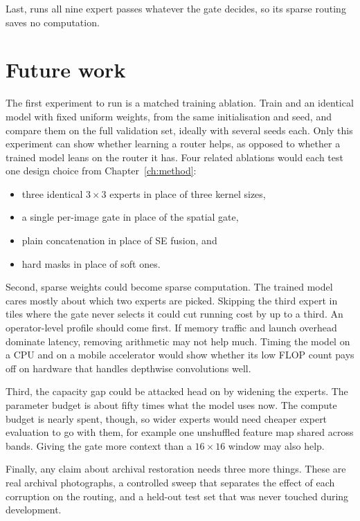 Last, \fcsg{} runs all nine expert passes whatever the gate decides, so its
sparse routing saves no computation.

\section{Future work}\label{sec:future}

The first experiment to run is a matched training ablation. Train \fcsg{} and
an identical model with fixed uniform weights, from the same initialisation
and seed, and compare them on the full validation set, ideally with several
seeds each. Only this experiment can show whether learning a router helps, as
opposed to whether a trained model leans on the router it has. Four related
ablations would each test one design choice from Chapter~\ref{ch:method}:
\begin{itemize}
	\item three identical $3\times3$ experts in place of three kernel sizes,
	\item a single per-image gate in place of the spatial gate,
	\item plain concatenation in place of SE fusion, and
	\item hard masks in place of soft ones.
\end{itemize}

Second, sparse weights could become sparse computation. The trained model
cares mostly about which two experts are picked. Skipping the third expert in
tiles where the gate never selects it could cut running cost by up to a
third. An operator-level profile should come first. If memory traffic and
launch overhead dominate latency, removing arithmetic may not help much. Timing
the model on a CPU and on a mobile accelerator would show whether its low
FLOP count pays off on hardware that handles depthwise convolutions well.

Third, the capacity gap could be attacked head on by widening the experts.
The parameter budget is about fifty times what the model uses now. The
compute budget is nearly spent, though, so wider experts would need cheaper
expert evaluation to go with them, for example one unshuffled feature map
shared across bands. Giving the gate more context than a $16\times16$ window
may also help.

Finally, any claim about archival restoration needs three more things. These
are real archival photographs, a controlled sweep that separates the effect
of each corruption on the routing, and a held-out test set that was never
touched during development.
